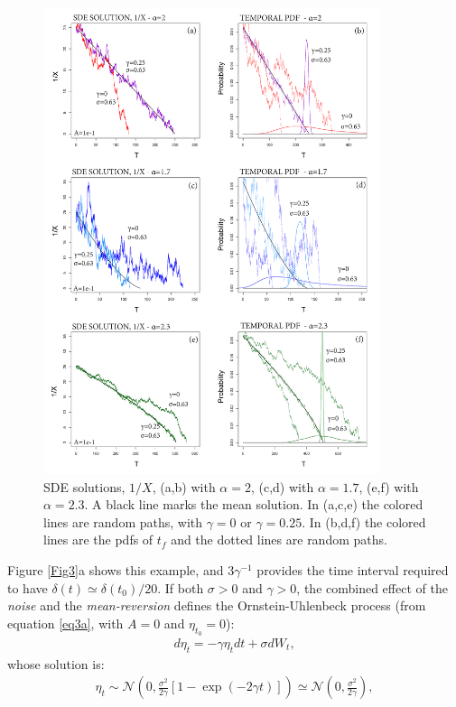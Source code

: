 \documentclass{article}
\begin{document}
\begin{figure}[H]
\centering
\includegraphics[width=0.88\textwidth]{Fig2_plus.png}
\caption{SDE solutions, $1/X$, (a,b) with $\alpha=2$, (c,d) with $\alpha=1.7$, (e,f) with $\alpha=2.3$. A black line marks the mean solution. In (a,c,e) the colored lines are random paths, with $\gamma=0$ or $\gamma=0.25$. In (b,d,f) the colored lines are the pdfs of $t_f$ and the dotted lines are random paths.}
\label{Fig2}
\end{figure}
Figure \ref{Fig3}a shows this example, and $3\gamma^{-1}$ provides the time interval required to have $\delta(t)\simeq\delta(t_0)/20$.
If both $\sigma>0$ and $\gamma>0$, the combined effect of the {\it noise} and the {\it mean-reversion} defines the Ornstein-Uhlenbeck process (from equation \ref{eq3a}, with $A=0$ and $\eta_{t_0}=0$):
\begin{align}\label{eq4a}
d\eta_t=-\gamma\eta_t dt+\sigma dW_t,
\end{align}
whose solution is:
\begin{align}\label{eq4b}
\eta_t\sim\mathcal N\left(0,\frac{\sigma^2}{2\gamma}\left[1-\exp(-2\gamma t)\right]\right)\simeq \mathcal N\left(0,\frac{\sigma^2}{2\gamma}\right),
\end{align}
\end{document}
